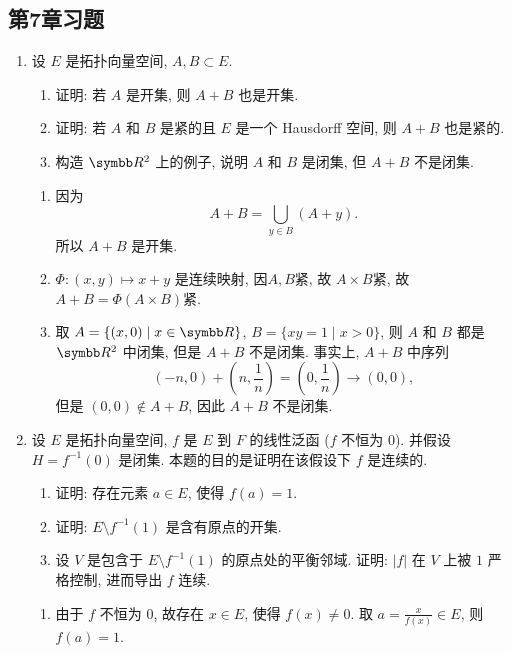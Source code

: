 \subsection{第7章习题}
\begin{enumerate}
  \item 设 $E$ 是拓扑向量空间, $A,B\subset E$.

    \begin{enumerate}
      \item 证明: 若 $A$ 是开集, 则 $A+B$ 也是开集.

      \item 证明: 若 $A$ 和 $B$ 是紧的且 $E$ 是一个 Hausdorff 空间, 则 $A+B$ 也是紧的.

      \item 构造 $\R^2$ 上的例子, 说明 $A$ 和 $B$ 是闭集, 但 $A+B$ 不是闭集.
    \end{enumerate}
    \begin{answer}
      \begin{enumerate}
        \item 因为
        \[A+B=\bigcup_{y\in B}(A+y).\]
        所以 $A+B$ 是开集.
    
        \item $\varPhi:(x,y)\mapsto x+y$ 是连续映射, 因$A,B$紧, 故 $A\times B$紧, 故 $A+B=\varPhi(A\times B)$紧.
    
        \item 取 $A=\{(x,0)\mid x\in\R\}$, $B=\{xy=1\mid x>0\}$,
        则 $A$ 和 $B$ 都是 $\R^2$ 中闭集, 但是 $A+B$ 不是闭集.
        事实上, $A+B$ 中序列
        \[(-n,0)+(n,\frac{1}{n})=(0,\frac{1}{n})\to (0,0),\]
        但是 $(0,0)\notin A+B$, 因此 $A+B$ 不是闭集.
      \end{enumerate}
    \end{answer}
  \item 设 $E$ 是拓扑向量空间, $f$ 是 $E$ 到 $F$ 的线性泛函 ($f$ 不恒为 $0$). 
  并假设 $H=f^{-1}(0)$ 是闭集. 本题的目的是证明在该假设下 $f$ 是连续的.

    \begin{enumerate}
      \item 证明: 存在元素 $a\in E$, 使得 $f(a)=1$.

      \item 证明: $E\setminus f^{-1}(1)$ 是含有原点的开集.
  
      \item 设 $V$ 是包含于 $E\setminus f^{-1}(1)$ 的原点处的平衡邻域. 证明: $|f|$ 在 $V$ 上被 $1$ 严格控制, 进而导出 $f$ 连续.
    \end{enumerate}
    \begin{answer}
      \begin{enumerate}
        \item 由于 $f$ 不恒为 $0$, 故存在 $x\in E$, 使得 $f(x)\neq 0$.
        取 $a=\frac{x}{f(x)}\in E$, 则 $f(a)=1$.
    

\end{enumerate}
\end{answer}
\end{enumerate}
